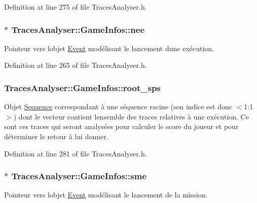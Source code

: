 Definition at line 275 of file Traces\+Analyser.\+h.

\subsubsection[{\texorpdfstring{nee}{nee}}]{$\ast$ Traces\+Analyser\+::\+Game\+Infos\+::nee}\hypertarget{struct_traces_analyser_1_1_game_infos_a9536f8b96fa309397655264cc2983063}{}\label{struct_traces_analyser_1_1_game_infos_a9536f8b96fa309397655264cc2983063}
Pointeur vers l\textquotesingle{}objet \hyperlink{class_event}{Event} modélisant le lancement d\textquotesingle{}une exécution. 

Definition at line 265 of file Traces\+Analyser.\+h.

\subsubsection[{\texorpdfstring{root\+\_\+sps}{root_sps}}]{ Traces\+Analyser\+::\+Game\+Infos\+::root\+\_\+sps}\hypertarget{struct_traces_analyser_1_1_game_infos_a674838500aafddb2a17153413708be08}{}\label{struct_traces_analyser_1_1_game_infos_a674838500aafddb2a17153413708be08}
Objet \hyperlink{class_sequence}{Sequence} correspondant à une séquence racine (son indice est donc $<$1\+:1$>$) dont le vecteur contient l\textquotesingle{}ensemble des traces relatives à une exécution. Ce sont ces traces qui seront analysées pour calculer le score du joueur et pour déterminer le retour à lui donner. 

Definition at line 281 of file Traces\+Analyser.\+h.

\subsubsection[{\texorpdfstring{sme}{sme}}]{$\ast$ Traces\+Analyser\+::\+Game\+Infos\+::sme}\hypertarget{struct_traces_analyser_1_1_game_infos_ae14dc2f1fb7fd6f6ebc774adcc7453ff}{}\label{struct_traces_analyser_1_1_game_infos_ae14dc2f1fb7fd6f6ebc774adcc7453ff}
Pointeur vers l\textquotesingle{}objet \hyperlink{class_event}{Event} modélisant le lancement de la mission. 

